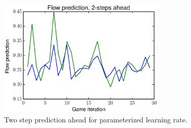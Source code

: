 \documentclass{sig-alternate-ipsn13}
\begin{document}








\begin{figure}
  \centering
  \includegraphics[width=80mm]{images/two_steps_ahead_prediction}
  \caption{Two step prediction ahead for parameterized learning rate.}
  \label{fig:parameterized}
\end{figure}
\end{document}
